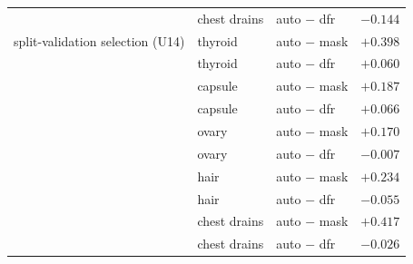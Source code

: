 {\begin{longtable}{p{4.0cm}p{3.6cm}p{5.2cm}c}
 & chest drains & auto $-$ dfr & $-0.144$ \\
split-validation selection (U14) & thyroid & auto $-$ mask & $+0.398$ \\
 & thyroid & auto $-$ dfr & $+0.060$ \\
 & capsule & auto $-$ mask & $+0.187$ \\
 & capsule & auto $-$ dfr & $+0.066$ \\
 & ovary & auto $-$ mask & $+0.170$ \\
 & ovary & auto $-$ dfr & $-0.007$ \\
 & hair & auto $-$ mask & $+0.234$ \\
 & hair & auto $-$ dfr & $-0.055$ \\
 & chest drains & auto $-$ mask & $+0.417$ \\
 & chest drains & auto $-$ dfr & $-0.026$ \\
\end{longtable}}

